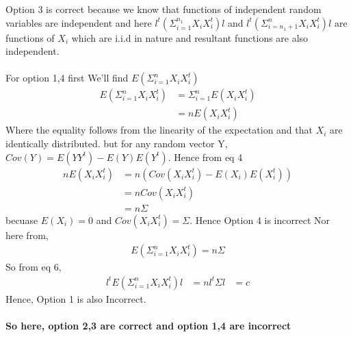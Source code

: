 \documentclass[journal,12pt,twocolumn]{IEEEtran}
\begin{document}
Option 3 is correct because we know that functions of independent random variables are independent and here \(l^t(\Sigma_{i=1}^{n_1}X_iX_i^t)l\) and \(l^t(\Sigma_{i={n_1+1}}^nX_iX_i^t)l\) are functions of \(X_i\) which are i.i.d in nature and resultant functions are also independent.\\\\
For option 1,4 first We'll find \(E(\Sigma_{i=1}^nX_iX_i^t)\)
\begin{equation}
    \begin{split}
        E(\Sigma_{i=1}^nX_iX_i^t) &= \Sigma_{i=1}^nE(X_iX_i^t)\\
        &=nE(X_iX_i^t)
    \end{split}
\end{equation}
Where the equality follows from the linearity of the expectation and that \(X_i\) are identically distributed. but for any random vector Y, \(Cov(Y) = E(YY^t) - E(Y)E(Y^t)\). Hence from eq 4
\begin{equation}
\begin{split}
    nE(X_iX_i^t) &= n(Cov(X_iX_i^t) - E(X_i)E(X_i^t))\\
    &=nCov(X_iX_i^t)\\
    &=n\Sigma
\end{split}
\end{equation}
becuase \(E(X_i) = 0\) and \(Cov(X_iX_i^t)=\Sigma\). Hence Option 4 is incorrect
Nor here from,
\begin{equation}
    \begin{split}
        E(\Sigma_{i=1}^nX_iX_i^t) = n\Sigma
    \end{split}
\end{equation}
So from eq 6,
\begin{equation}
    \begin{split}
        l^tE(\Sigma_{i=1}^nX_iX_i^t)l &= nl^t\Sigma l
        &=c
    \end{split}
\end{equation}
Hence, Option 1 is also Incorrect.\\\\
\textbf{So here, option 2,3 are correct and option 1,4 are incorrect}
\end{document}
